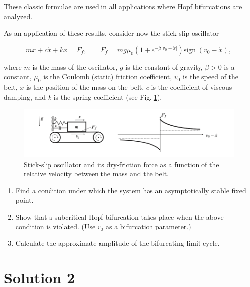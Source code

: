 \documentclass[twoside,10pt,a4paper]{article}
\begin{document}
These classic formulae are used in all applications where Hopf bifurcations are analyzed.

As an application of these results, consider now the stick-slip oscillator

\begin{equation*}
m\ddot{x}+c\dot{x}+kx=F_f, \qquad F_f=mg\mu_0\left(1+e^{-\beta |v_0-\dot{x}|} \right)\text{sign }(v_0-\dot{x}),
\end{equation*}

where $m$ is the mass of the oscillator, $g$ is the constant of gravity, $\beta>0$ is a constant, $\mu_0$ is the Coulomb (static) friction coefficient, $v_0$ is the speed of the belt, $x$ is the position of the mass on the belt, $c$ is the coefficient of viscous damping, and $k$ is the spring coefficient (see Fig. \ref{fig2}).

\begin{figure}[h!]
\includegraphics[width = \textwidth]{Graphics/hopf.png}
\caption{Stick-slip oscillator and its dry-friction force as a function of the relative velocity between the mass and the belt.}
\label{fig2}
\end{figure}
\begin{enumerate}[label=(\alph*)]
\item Find a condition under which the system has an asymptotically stable fixed point.
\item Show that a subcritical Hopf bifurcation takes place when the above condition is violated. (Use $v_0$ as a bifurcation parameter.)
\item Calculate the approximate amplitude of the bifurcating limit cycle.
\end{enumerate}
\section*{Solution 2}
\end{document}
